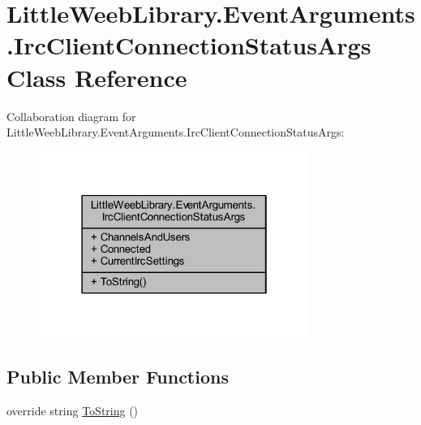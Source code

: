 \hypertarget{class_little_weeb_library_1_1_event_arguments_1_1_irc_client_connection_status_args}{}\section{Little\+Weeb\+Library.\+Event\+Arguments.\+Irc\+Client\+Connection\+Status\+Args Class Reference}
\label{class_little_weeb_library_1_1_event_arguments_1_1_irc_client_connection_status_args}


Collaboration diagram for Little\+Weeb\+Library.\+Event\+Arguments.\+Irc\+Client\+Connection\+Status\+Args\+:\nopagebreak
\begin{figure}[H]
\begin{center}
\leavevmode
\includegraphics[width=250pt]{class_little_weeb_library_1_1_event_arguments_1_1_irc_client_connection_status_args__coll__graph}
\end{center}
\end{figure}
\subsection*{Public Member Functions}
\begin{DoxyCompactItemize}
\item 
override string \mbox{\hyperlink{class_little_weeb_library_1_1_event_arguments_1_1_irc_client_connection_status_args_a71fdd09abcc607734be01125338fa928}{To\+String}} ()
\end{DoxyCompactItemize}
